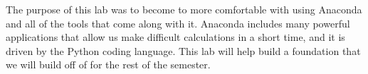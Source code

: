 The purpose of this lab was to become to more comfortable with using Anaconda and all of the tools that come along with it. Anaconda includes many powerful applications that allow us make difficult calculations in a short time, and it is driven by the Python coding language. This lab will help build a foundation that we will build off of for the rest of the semester.

